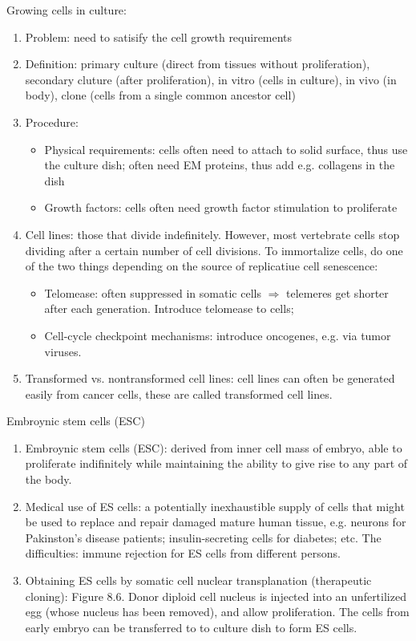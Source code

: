 \documentclass{report}
\begin{document}
Growing cells in culture: 
\begin{enumerate}
\item Problem: need to satisify the cell growth requirements
	
\item Definition: primary culture (direct from tissues without proliferation), secondary cluture (after proliferation), in vitro (cells in culture), in vivo (in body), clone (cells from a single common ancestor cell)
	
\item Procedure:
\begin{itemize}
	\item Physical requirements: cells often need to attach to solid surface, thus use the culture dish; often need EM proteins, thus add e.g. collagens in the dish
	\item Growth factors: cells often need growth factor stimulation to proliferate 
\end{itemize}

\item Cell lines: those that divide indefinitely. However, most vertebrate cells stop dividing after a certain number of cell divisions. To immortalize cells, do one of the two things depending on the source of replicatiue cell senescence: 
\begin{itemize}
	\item Telomease: often suppressed in somatic cells $\Rightarrow$ telemeres get shorter after each generation. Introduce telomease to cells; 
	\item Cell-cycle checkpoint mechanisms: introduce oncogenes, e.g. via tumor viruses.
\end{itemize}

\item Transformed vs. nontransformed cell lines: cell lines can often be generated easily from cancer cells, these are called transformed cell lines. 
\end{enumerate}

Embroynic stem cells (ESC)
\begin{enumerate}
\item Embroynic stem cells (ESC): derived from inner cell mass of embryo, able to proliferate indifinitely while maintaining the ability to give rise to any part of the body. 

\item Medical use of ES cells: a potentially inexhaustible supply of cells that might be used to replace and repair damaged mature human tissue, e.g. neurons for Pakinston's disease patients; insulin-secreting cells for diabetes; etc. The difficulties: immune rejection for ES cells from different persons. 

\item Obtaining ES cells by somatic cell nuclear transplanation (therapeutic cloning): Figure 8.6. Donor diploid cell nucleus is injected into an unfertilized egg (whose nucleus has been removed), and allow proliferation. The cells from early embryo can be transferred to to culture dish to form ES cells.  
\end{enumerate}
\end{document}
